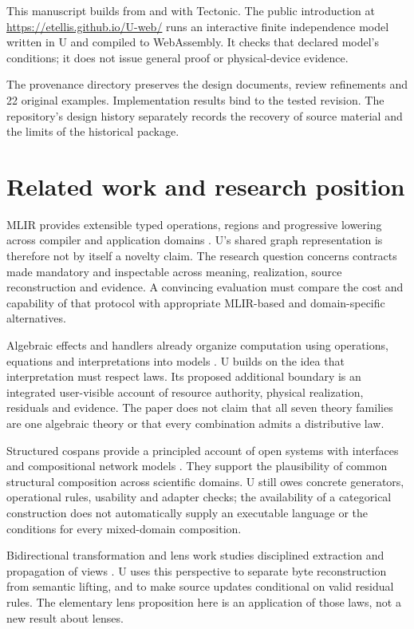 \documentclass[11pt]{article}
\theoremstyle{remark}
\begin{document}
This manuscript builds from  and
 with Tectonic. The public introduction at
\url{https://etellis.github.io/U-web/} runs an interactive finite independence
model written in U and compiled to WebAssembly. It checks that declared
model's conditions; it does not issue general proof or physical-device
evidence.

The provenance directory preserves the design documents, review refinements
and 22 original examples. Implementation results bind to the tested revision.
The repository's design history separately records the recovery of source
material and the limits of the historical package.

\section{Related work and research position}

MLIR provides extensible typed operations, regions and progressive lowering
across compiler and application domains \cite{lattner-mlir}. U's shared
graph representation is therefore not by itself a novelty claim. The
research question concerns contracts made mandatory and inspectable across
meaning, realization, source reconstruction and evidence. A convincing
evaluation must compare the cost and capability of that protocol with
appropriate MLIR-based and domain-specific alternatives.

Algebraic effects and handlers already organize computation using operations,
equations and interpretations into models \cite{plotkin-handlers}. U builds
on the idea that interpretation must respect laws. Its proposed additional
boundary is an integrated user-visible account of resource authority,
physical realization, residuals and evidence. The paper does not claim
that all seven theory families are one algebraic theory or that every
combination admits a distributive law.

Structured cospans provide a principled account of open systems with
interfaces and compositional network models \cite{baez-courser}. They
support the plausibility of common structural composition across scientific
domains. U still owes concrete generators, operational rules, usability and
adapter checks; the availability of a categorical construction does not
automatically supply an executable language or the conditions for every
mixed-domain composition.

Bidirectional transformation and lens work studies disciplined extraction
and propagation of views \cite{foster-lenses}. U uses this perspective to
separate byte reconstruction from semantic lifting, and to make source
updates conditional on valid residual rules. The elementary lens proposition
here is an application of those laws, not a new result about lenses.
\end{document}
